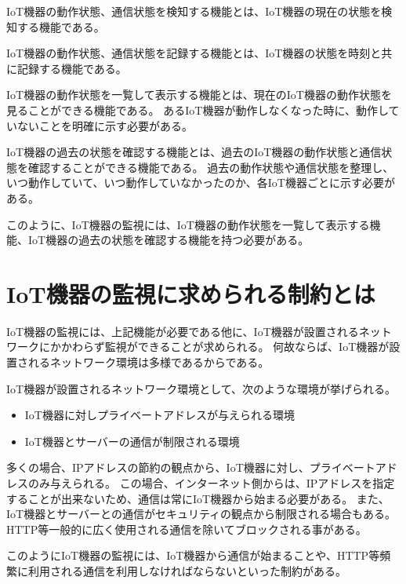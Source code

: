 IoT機器の動作状態、通信状態を検知する機能とは、IoT機器の現在の状態を検知する機能である。

IoT機器の動作状態、通信状態を記録する機能とは、IoT機器の状態を時刻と共に記録する機能である。

IoT機器の動作状態を一覧して表示する機能とは、現在のIoT機器の動作状態を見ることができる機能である。
あるIoT機器が動作しなくなった時に、動作していないことを明確に示す必要がある。
\medskip

IoT機器の過去の状態を確認する機能とは、過去のIoT機器の動作状態と通信状態を確認することができる機能である。
過去の動作状態や通信状態を整理し、いつ動作していて、いつ動作していなかったのか、各IoT機器ごとに示す必要がある。
\medskip

このように、IoT機器の監視には、IoT機器の動作状態を一覧して表示する機能、IoT機器の過去の状態を確認する機能を持つ必要がある。

\section{IoT機器の監視に求められる制約とは}%
IoT機器の監視には、上記機能が必要である他に、IoT機器が設置されるネットワークにかかわらず監視ができることが求められる。
何故ならば、IoT機器が設置されるネットワーク環境は多様であるからである。
\medskip

IoT機器が設置されるネットワーク環境として、次のような環境が挙げられる。
\begin{itemize}
	\item IoT機器に対しプライベートアドレスが与えられる環境
	\item IoT機器とサーバーの通信が制限される環境
\end{itemize}

多くの場合、IPアドレスの節約の観点から、IoT機器に対し、プライベートアドレスのみ与えられる。
この場合、インターネット側からは、IPアドレスを指定することが出来ないため、通信は常にIoT機器から始まる必要がある。
また、IoT機器とサーバーとの通信がセキュリティの観点から制限される場合もある。
HTTP等一般的に広く使用される通信を除いてブロックされる事がある。
\medskip

このようにIoT機器の監視には、IoT機器から通信が始まることや、HTTP等頻繁に利用される通信を利用しなければならないといった制約がある。


